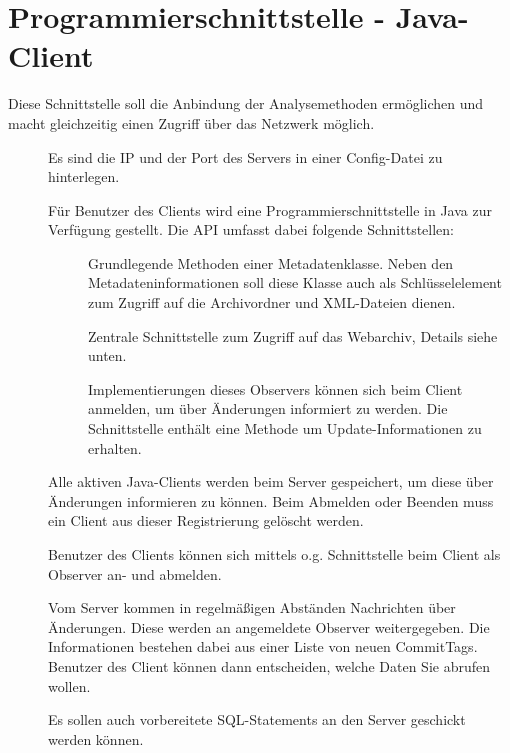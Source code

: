 \section{Programmierschnittstelle - Java-Client}\label{spec:client}
	Diese Schnittstelle soll die Anbindung der Analysemethoden ermöglichen und 
	macht gleichzeitig einen Zugriff über das Netzwerk möglich.
\begin{description}
	\item []
		Es sind die IP und der Port des Servers in einer Config-Datei zu hinterlegen.
	\item []
		Für Benutzer des Clients wird eine Programmierschnittstelle in Java zur Verfügung gestellt.
		Die API umfasst dabei folgende Schnittstellen:
		\begin{description}
			\item []
				Grundlegende Methoden einer Metadatenklasse.
				Neben den Metadateninformationen soll diese Klasse auch als
				Schlüsselelement zum Zugriff auf die Archivordner und XML-Dateien dienen.
			\item []
				Zentrale Schnittstelle zum Zugriff auf das Webarchiv, Details siehe unten.
			\item []
				Implementierungen dieses Observers können sich beim Client anmelden, 
				um über Änderungen informiert zu werden. 
				Die Schnittstelle enthält eine Methode um Update-Informationen zu erhalten.
		\end{description}
	\item []
		Alle aktiven Java-Clients werden beim Server gespeichert, 
		um diese über Änderungen informieren zu können.
		Beim Abmelden oder Beenden muss ein Client aus dieser Registrierung gelöscht werden.
	\item []
		Benutzer des Clients können sich mittels o.g. Schnittstelle beim Client als Observer an- und abmelden.
	\item []
		Vom Server kommen in regelmäßigen Abständen Nachrichten über Änderungen.
		Diese werden an angemeldete Observer weitergegeben.
		Die Informationen bestehen dabei aus einer Liste von neuen CommitTags.
		Benutzer des Client können dann entscheiden, welche Daten Sie abrufen wollen.
	\item []
		Es sollen auch vorbereitete SQL-Statements an den Server geschickt werden können. 

\end{description}
